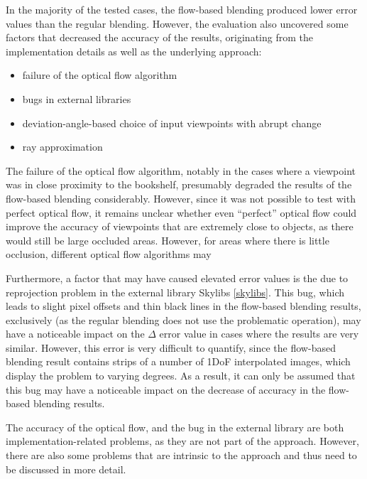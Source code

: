 In the majority of the tested cases, the flow-based blending produced lower error values than the regular blending. However, the evaluation also uncovered some factors that decreased the accuracy of the results, originating from the implementation details as well as the underlying approach:

\begin{itemize}
  \item failure of the optical flow algorithm
  \item bugs in external libraries
  \item deviation-angle-based choice of input viewpoints with abrupt change
  \item ray approximation
\end{itemize}

The failure of the optical flow algorithm, notably in the cases where a viewpoint was in close proximity to the bookshelf, presumably degraded the results of the flow-based blending considerably. However, since it was not possible to test with perfect optical flow, it remains unclear whether even ``perfect'' optical flow could improve the accuracy of viewpoints that are extremely close to objects, as there would still be large occluded areas. However, for areas where there is little occlusion, different optical flow algorithms may 

Furthermore, a factor that may have caused elevated error values is the due to reprojection problem in the external library Skylibs \ref{skylibs}. This bug, which leads to slight pixel offsets and thin black lines in the flow-based blending results, exclusively (as the regular blending does not use the problematic operation), may have a noticeable impact on the $\Delta$ error value in cases where the results are very similar. However, this error is very difficult to quantify, since the flow-based blending result contains strips of a number of 1DoF interpolated images, which display the problem to varying degrees. As a result, it can only be assumed that this bug may have a noticeable impact on the decrease of accuracy in the flow-based blending results.

The accuracy of the optical flow, and the bug in the external library are both implementation-related problems, as they are not part of the approach. However, there are also some problems that are intrinsic to the approach and thus need to be discussed in more detail.


